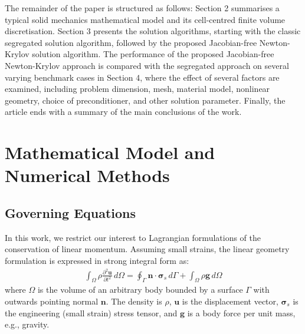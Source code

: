 \documentclass[sn-mathphys,Numbered,draft]{sn-jnl}%
\newcommand{\bb}{\boldsymbol}
\begin{document}
The remainder of the paper is structured as follows:
Section 2 summarises a typical solid mechanics mathematical model and its cell-centred finite volume discretisation.
Section 3 presents the solution algorithms, starting with the classic segregated solution algorithm, followed by the proposed Jacobian-free Newton-Krylov solution algorithm.
The performance of the proposed Jacobian-free Newton-Krylov approach is compared with the segregated approach on several varying benchmark cases in Section 4, where the effect of several factors are examined, including problem dimension, mesh, material model, nonlinear geometry, choice of preconditioner, and other solution parameter.
Finally, the article ends with a summary of the main conclusions of the work.


\section{Mathematical Model and Numerical Methods}\label{sec:math_model}

%

\subsection{Governing Equations} \label{sec:governing_eqn}

In this work, we restrict our interest to Lagrangian formulations of the conservation of linear momentum.
Assuming small strains, the linear geometry formulation is expressed in strong integral form as:
\begin{eqnarray} \label{eqn:momentum_lingeom}
    \int_{\Omega} \rho \frac{\partial^2 \bb{u} }{\partial t^2} \, d\Omega
    =
    \oint_{\Gamma} \bb{n} \cdot \bb{\sigma}_s \,  d\Gamma
    + \int_{\Omega}  \rho \bb{g} \, d\Omega
\end{eqnarray}
where $\Omega$ is the volume of an arbitrary body bounded by a surface $\Gamma$ with outwards pointing normal $\bb{n}$.
The density is $\rho$, $\bb{u}$ is the displacement vector, $\bb{\sigma}_s$ is the engineering (small strain) stress tensor, and $\bb{g}$ is a body force per unit mass, e.g., gravity.
\end{document}
